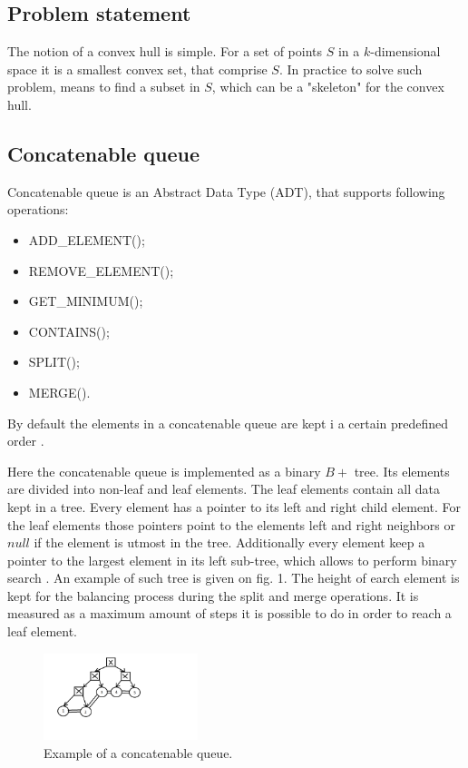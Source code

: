 \documentclass[conference]{IEEEtran}
\theoremstyle{plane}
\begin{document}
\subsection{Problem statement}

The notion of a convex hull is simple. For a set of points $S$ in a $k$-dimensional space it is a smallest convex set, that comprise $S$. In practice to solve such problem, means to find a subset in $S$, which can be a "skeleton" for the convex hull.

\subsection{Concatenable queue}

Concatenable queue is an Abstract Data Type (ADT), that supports following operations:

\begin{itemize}
	\item
	ADD\_ELEMENT();
	\item
	REMOVE\_ELEMENT();
	\item
	GET\_MINIMUM();
	\item
	CONTAINS();
	\item
	SPLIT();
	\item
	MERGE().
\end{itemize}

By default the elements in a concatenable queue are kept i a certain predefined order \cite{aho}.

Here the concatenable queue is implemented as a binary  $B+$ tree. Its elements are divided into non-leaf and leaf elements. The leaf elements contain all data kept in a tree. Every element has a pointer to its left and right child element. For the leaf elements those pointers point to the elements left and right neighbors or $null$ if the element is utmost in the tree. 
Additionally every element keep a pointer to the largest element in its left sub-tree, which  allows to perform binary search \cite{aho}.  An example of such tree is given on fig. 1. The height of earch element is kept for the balancing process during the split and merge operations. It is measured as a maximum amount of steps it is possible to do in order to reach a leaf element.

\begin{figure}[htbp]
	\centerline{\includegraphics[width=0.4\textwidth, height=0.2\textheight]{cq_example}}
	\caption{Example of a concatenable queue.}
	\label{cq_example}
\end{figure}
\end{document}
